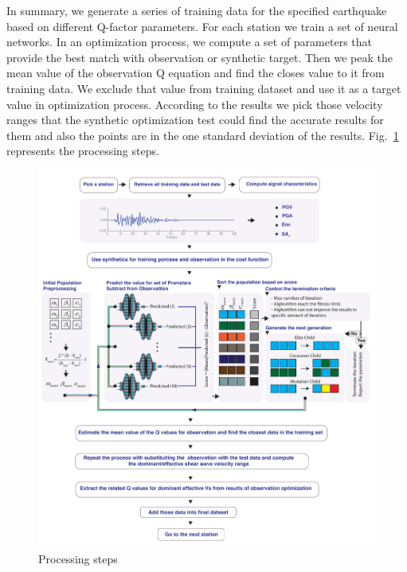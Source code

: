 
In summary, we generate a series of training data for the specified earthquake based on different Q-factor parameters. For each station we train a set of neural networks. In an optimization process, we compute a set of parameters that provide the best match with observation or synthetic target. Then we peak the mean value of the observation Q equation and find the closes value to it from training data. We exclude that value from training dataset and use it as a target value in optimization process. According to the results we pick those velocity ranges that the synthetic optimization test could find the accurate results for them and also the points are in the one standard deviation of the results. Fig.~\ref{fig:Figure_1} represents the processing steps. 

 \begin{figure}
    \centering
    \includegraphics[width=\textwidth]{figures/pdf/Figure_1.pdf}
    \caption{Processing steps}
    \label{fig:Figure_1}
\end{figure}




